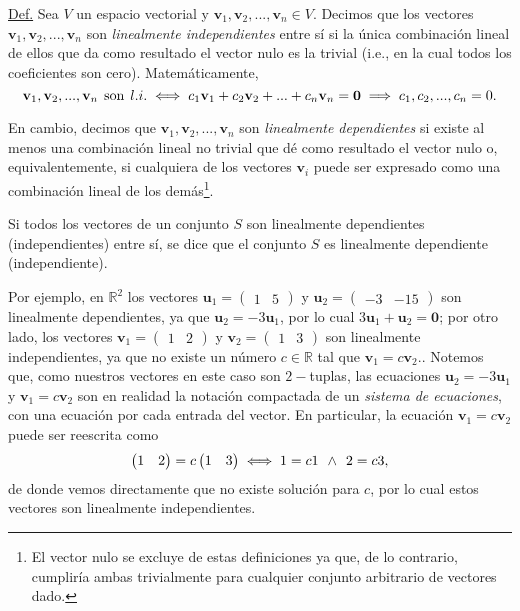 \documentclass[12pt,dvipsnames]{article}
\begin{document}
\begin{tcolorbox}

    \underline{Def.} Sea $V$ un espacio vectorial y $\mathbf{v}_1,\mathbf{v}_2,...,\mathbf{v}_n\in V$. Decimos que los vectores $\mathbf{v}_1,\mathbf{v}_2, ...,\mathbf{v}_n$ son \emph{linealmente independientes} entre sí si la única combinación lineal de ellos que da como resultado el vector nulo es la trivial (i.e., en la cual todos los coeficientes son cero). Matemáticamente, $$\mathbf{v}_1,\mathbf{v}_2, ..., \mathbf{v}_n \hspace{1.5mm} \text{son} \hspace{1.5mm} l.i. \iff c_1\mathbf{v}_1+c_2\mathbf{v}_2+...+c_n\mathbf{v}_n=\mathbf{0}\implies c_1,c_2, ...,c_n=0.$$

    En cambio, decimos que $\mathbf{v}_1,\mathbf{v}_2, ..., \mathbf{v}_n$ son \emph{linealmente dependientes} si existe al menos una combinación lineal no trivial que dé como resultado el vector nulo o, equivalentemente, si cualquiera de los vectores $\mathbf{v}_i$ puede ser expresado como una combinación lineal de los demás\footnote{El vector nulo se excluye de estas definiciones ya que, de lo contrario, cumpliría ambas trivialmente para cualquier conjunto arbitrario de vectores dado.}.

    Si todos los vectores de un conjunto $S$ son linealmente dependientes (independientes) entre sí, se dice que el conjunto $S$ es linealmente dependiente (independiente).

\end{tcolorbox}

Por ejemplo, en $\mathbb{R}^2$ los vectores $\mathbf{u}_1=\begin{pmatrix} 1 & 5 \end{pmatrix}$ y $\mathbf{u}_2=\begin{pmatrix} -3 & -15 \end{pmatrix}$ son linealmente dependientes, ya que $\mathbf{u}_2=-3\mathbf{u}_1$, por lo cual $3\mathbf{u}_1+\mathbf{u}_2=\mathbf{0}$; por otro lado, los vectores $\mathbf{v}_1=\begin{pmatrix} 1 & 2 \end{pmatrix}$ y $\mathbf{v}_2=\begin{pmatrix} 1 & 3 \end{pmatrix}$ son linealmente independientes, ya que no existe un número $c\in\mathbb{R}$ tal que $\mathbf{v}_1=c\mathbf{v}_2.$. Notemos que, como nuestros vectores en este caso son $2-$tuplas, las ecuaciones $\mathbf{u}_2=-3\mathbf{u}_1$ y $\mathbf{v}_1=c\mathbf{v}_2$ son en realidad la notación compactada de un \emph{sistema de ecuaciones}, con una ecuación por cada entrada del vector. En particular, la ecuación $\mathbf{v}_1=c\mathbf{v}_2$ puede ser reescrita como $$\begin{pmatrix} 1 & 2 \end{pmatrix}=c\begin{pmatrix} 1 & 3 \end{pmatrix}\iff 1=c1 \hspace{1.5mm} \land\hspace{1.5mm} 2=c3,$$ de donde vemos directamente que no existe solución para $c$, por lo cual estos vectores son linealmente independientes.
\end{document}
